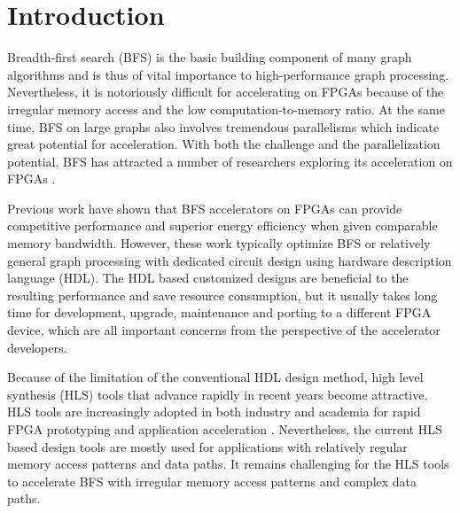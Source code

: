 \section{Introduction} \label{sec:intro}
Breadth-first search (BFS) is the basic building component of many graph algorithms 
and is thus of vital importance to high-performance graph processing. Nevertheless, 
it is notoriously difficult for accelerating on FPGAs because of the 
irregular memory access and the low computation-to-memory ratio. 
At the same time, BFS on large graphs also involves tremendous 
parallelisms which indicate great potential for acceleration. 
With both the challenge and the parallelization potential, 
BFS has attracted a number of researchers exploring its acceleration on FPGAs 
\cite{attia2014cygraph, betkaoui2012reconfigurable, Dai2017foregraph, Ma2017fpga,
umuroglu2015hybrid, oguntebi2016graphops, engelhardt2016gravf, zhou2016high}. 

Previous work have shown that BFS accelerators on FPGAs can provide competitive  
performance and superior energy efficiency when given comparable memory bandwidth. 
However, these work typically optimize BFS or relatively general graph processing 
with dedicated circuit design using hardware description language (HDL). The HDL 
based customized designs are beneficial to the resulting performance 
and save resource consumption, but it usually takes long time for development, 
upgrade, maintenance and porting to a different FPGA device, which are all 
important concerns from the perspective of the accelerator developers. 


Because of the limitation of the conventional HDL design method, 
high level synthesis (HLS) tools that advance rapidly in recent years
become attractive. HLS tools are increasingly adopted in both 
industry and academia for rapid FPGA 
prototyping and application acceleration \cite{koch2016fpgas, xilinx-sdaccel}. 
Nevertheless, the current HLS based design tools are mostly used for 
applications with relatively regular memory access patterns and data paths. 
It remains challenging for the HLS tools to accelerate BFS with irregular 
memory access patterns and complex data paths. 

